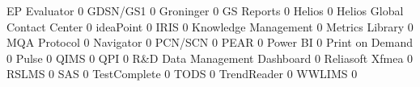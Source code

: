 \documentclass{article}
\begin{document}
\begin{Schunk}
\begin{Soutput}
  EP Evaluator                                                                     0
  GDSN/GS1                                                                         0
  Groninger                                                                        0
  GS Reports                                                                       0
  Helios                                                                           0
  Helios Global Contact Center                                                     0
  ideaPoint                                                                        0
  IRIS                                                                             0
  Knowledge Management                                                             0
  Metrics Library                                                                  0
  MQA Protocol                                                                     0
  Navigator                                                                        0
  PCN/SCN                                                                          0
  PEAR                                                                             0
  Power BI                                                                         0
  Print on Demand                                                                  0
  Pulse                                                                            0
  QIMS                                                                             0
  QPI                                                                              0
  R&D Data Management Dashboard                                                    0
  Reliasoft Xfmea                                                                  0
  RSLMS                                                                            0
  SAS                                                                              0
  TestComplete                                                                     0
  TODS                                                                             0
  TrendReader                                                                      0
  WWLIMS                                                                           0
                                                           

\end{Soutput}
\end{Schunk}
\end{document}
